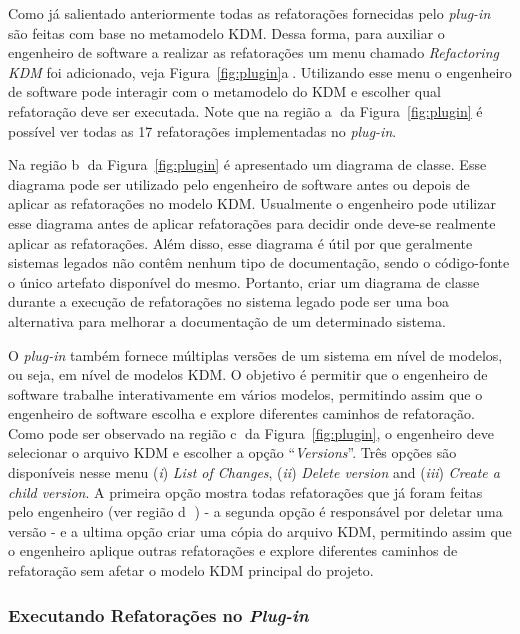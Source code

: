 Como já salientado anteriormente todas as refatorações fornecidas pelo \textit{plug-in} são feitas com base no metamodelo KDM. Dessa forma, para auxiliar o engenheiro de software a realizar as refatorações um menu chamado \textit{Refactoring KDM} foi adicionado, veja Figura~\ref{fig:plugin}\textcircled{a}. Utilizando esse menu o engenheiro de software pode interagir com o metamodelo do KDM e escolher qual refatoração deve ser executada. Note que na região \textcircled{a} da Figura~\ref{fig:plugin} é possível ver todas as 17 refatorações implementadas no \textit{plug-in}.

Na região \textcircled{b} da Figura~\ref{fig:plugin} é apresentado um diagrama de classe. Esse diagrama pode ser utilizado pelo engenheiro de software antes ou depois de aplicar as refatorações no modelo KDM. Usualmente o engenheiro pode utilizar esse diagrama antes de aplicar refatorações para decidir onde deve-se realmente aplicar as refatorações. Além disso, esse diagrama é útil por que geralmente sistemas legados não contêm nenhum tipo de documentação, sendo o código-fonte o único artefato disponível do mesmo. Portanto, criar um diagrama de classe durante a execução de refatorações no sistema legado pode ser uma boa alternativa para melhorar a documentação de um determinado sistema.

O \textit{plug-in} também fornece múltiplas versões de um sistema em nível de modelos, ou seja, em nível de modelos KDM. O objetivo é permitir que o engenheiro de software trabalhe interativamente em vários modelos, permitindo assim que o engenheiro de software escolha e explore diferentes caminhos de refatoração. Como pode ser observado na região  \textcircled{c} da Figura~\ref{fig:plugin}, o engenheiro deve selecionar o arquivo KDM e escolher a opção ``\textit{Versions}''. Três opções são disponíveis nesse menu (\textit{i}) \textit{List of Changes}, (\textit{ii}) \textit{Delete version} and (\textit{iii}) \textit{Create a child version}. A primeira opção mostra todas refatorações que já foram feitas pelo engenheiro (ver região \textcircled{d} ) - a segunda opção é responsável por deletar uma versão - e a ultima opção criar uma cópia do arquivo KDM, permitindo assim que o engenheiro aplique outras refatorações e explore diferentes caminhos de refatoração sem afetar o modelo KDM principal do projeto.


 \subsubsection{Executando Refatorações no \textit{Plug-in}}

